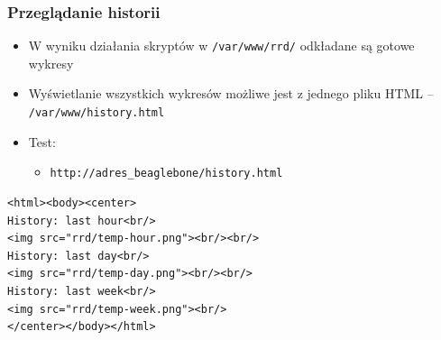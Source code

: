 \documentclass[dvipsnames,table]{beamer}
\begin{document}
\begin{frame}[fragile]
\frametitle{Przeglądanie historii}
\begin{itemize}
	\item W wyniku działania skryptów w {\tt /var/www/rrd/} odkładane są gotowe wykresy
	\item Wyświetlanie wszystkich wykresów możliwe jest z jednego pliku HTML -- {\tt /var/www/history.html}
	\item Test:
	\begin{itemize}
		\item {\tt http://adres\_beaglebone/history.html}
	\end{itemize}
\end{itemize}
\scriptsize
\begin{verbatim}
<html><body><center>
History: last hour<br/>
<img src="rrd/temp-hour.png"><br/><br/>
History: last day<br/>
<img src="rrd/temp-day.png"><br/><br/>
History: last week<br/>
<img src="rrd/temp-week.png"><br/>
</center></body></html>
\end{verbatim}
\end{frame}
\end{document}
